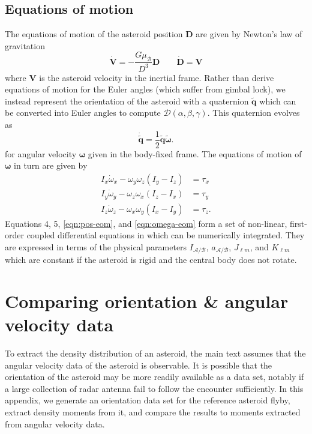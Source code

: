 \documentclass[9pt,twocolumn]{article}
\newcommand{\quat}[1]{\widetilde{\bm{#1}}}
\numberwithin{equation}{section}
\begin{document}
\subsection{Equations of motion}
\label{sec:eom}


The equations of motion of the asteroid position $\bm D$ are given by Newton's law of gravitation
\begin{equation}
  \dot{\bm V} = -\frac{G \mu_\mathcal{B}}{D^3} \bm D \qquad \dot{\bm D} = \bm V
  \label{eqn:pos-eom}
\end{equation}
where $\bm V$ is the asteroid velocity in the inertial frame. Rather than derive equations of motion for the Euler angles (which suffer from gimbal lock), we instead represent the orientation of the asteroid with a quaternion $\quat q$ which can be converted into Euler angles to compute $\mathcal{D}(\alpha, \beta, \gamma)$. This quaternion evolves as 
\begin{equation}
  \dot{\quat q} = \frac{1}{2}\quat q\quat \omega.
  \label{eqn:quat-eom}
\end{equation}
for angular velocity $\bm \omega$ given in the body-fixed frame. The equations of motion of $\bm \omega$ in turn are given by
\begin{equation}
  \begin{split}
    I_x \dot \omega_x - \omega_y \omega_z (I_y - I_z) &= \tau_x\\
    I_y \dot \omega_y - \omega_z \omega_x (I_z - I_x) &= \tau_y\\
    I_z \dot \omega_z - \omega_x \omega_y (I_x - I_y) &= \tau_z.
  \end{split}
  \label{eqn:omega-eom}
\end{equation}
Equations 4, 5, \ref{eqn:pos-eom}, and \ref{eqn:omega-eom} form a set of non-linear, first-order coupled differential equations in which can be numerically integrated. They are expressed in terms of the physical parameters $I_\mathcal{A/B}$, $a_\mathcal{A/B}$, $J_{\ell m}$, and $K_{\ell m}$ which are constant if the asteroid is rigid and the central body does not rotate.






\section{Comparing orientation \& angular velocity data}
\label{app:orientation}

To extract the density distribution of an asteroid, the main text assumes that the angular velocity data of the asteroid is observable. It is possible that the orientation of the asteroid may be more readily available as a data set, notably if a large collection of radar antenna fail to follow the encounter sufficiently. In this appendix, we generate an orientation data set for the reference asteroid flyby, extract density moments from it, and compare the results to moments extracted from angular velocity data.
\end{document}

